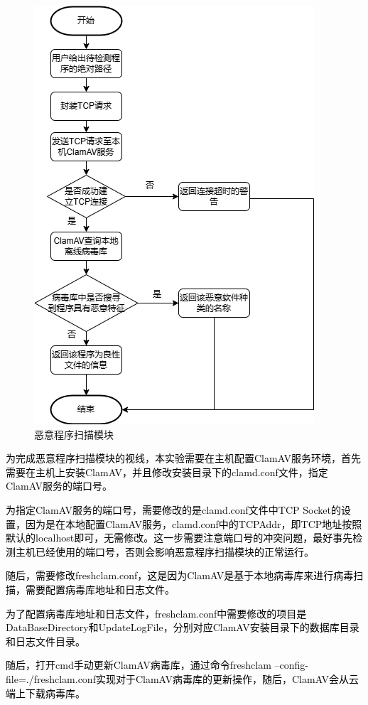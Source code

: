 \begin{figure}[htbp]
  \centering
  \includegraphics[]{images/malware_scan_module.png}
  \caption{恶意程序扫描模块}\label{fig:malware_scan_module}
\end{figure}
\textcolor{black}{为完成恶意程序扫描模块的视线，本实验需要在主机配置ClamAV服务环境，首先需要在主机上安装ClamAV，并且修改安装目录下的clamd.conf文件，指定ClamAV服务的端口号。}

\textcolor{black}{为指定ClamAV服务的端口号，需要修改的是clamd.conf文件中TCP Socket的设置，因为是在本地配置ClamAV服务，clamd.conf中的TCPAddr，即TCP地址按照默认的localhost即可，无需修改。这一步需要注意端口号的冲突问题，最好事先检测主机已经使用的端口号，否则会影响恶意程序扫描模块的正常运行。}

\textcolor{black}{随后，需要修改freshclam.conf，这是因为ClamAV是基于本地病毒库来进行病毒扫描，需要配置病毒库地址和日志文件。}

\textcolor{black}{为了配置病毒库地址和日志文件，freshclam.conf中需要修改的项目是DataBaseDirectory和UpdateLogFile，分别对应ClamAV安装目录下的数据库目录和日志文件目录。}

\textcolor{black}{随后，打开cmd手动更新ClamAV病毒库，通过命令freshclam –config-file=./freshclam.conf实现对于ClamAV病毒库的更新操作，随后，ClamAV会从云端上下载病毒库。}

